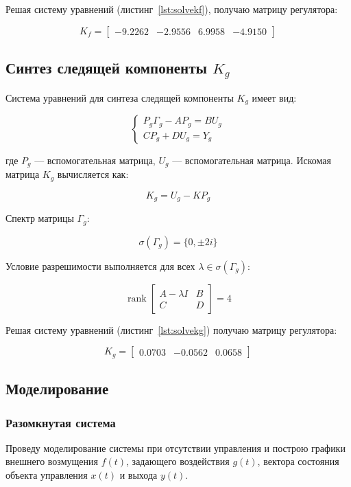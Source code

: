 \documentclass[a4paper,12pt]{article}
\begin{document}
Решая систему уравнений (листинг~\ref{lst:solvekf}), получаю матрицу регулятора:

\[
K_f = \begin{bmatrix}
	-9.2262 & -2.9556 & 6.9958 & -4.9150
\end{bmatrix}
\]
	
\subsection{Синтез следящей компоненты \(K_g\)}

Система уравнений для синтеза следящей компоненты \(K_g\) имеет вид:

\[
\begin{cases}
	P_g \Gamma_g - A P_g = B U_g \\
	C P_g + D U_g = Y_g
\end{cases}
\]

где \(P_g\) — вспомогательная матрица, \(U_g\) — вспомогательная матрица.
Искомая матрица \(K_g\) вычисляется как:

\[
K_g = U_g - K P_g
\]

Спектр матрицы \(\Gamma_g\):

\[
\sigma(\Gamma_g) = \{0, \pm 2i\}
\]

Условие разрешимости выполняется для всех \(\lambda \in \sigma(\Gamma_g)\):

\[
\operatorname{rank}
\begin{bmatrix}
	A - \lambda I & B \\
	C & D
\end{bmatrix}
= 4
\]

Решая систему уравнений (листинг~\ref{lst:solvekg}) получаю матрицу регулятора:

\[
K_g = \begin{bmatrix}
	0.0703 & -0.0562 & 0.0658
\end{bmatrix}
\]
	
	\subsection{Моделирование}
	
	\subsubsection{Разомкнутая система}
	
	Проведу моделирование системы при отсутствии управления и построю графики внешнего возмущения \(f(t)\), задающего воздействия \(g(t)\), вектора состояния объекта управления \(x(t)\) и выхода \(y(t)\).
	
\end{document}
